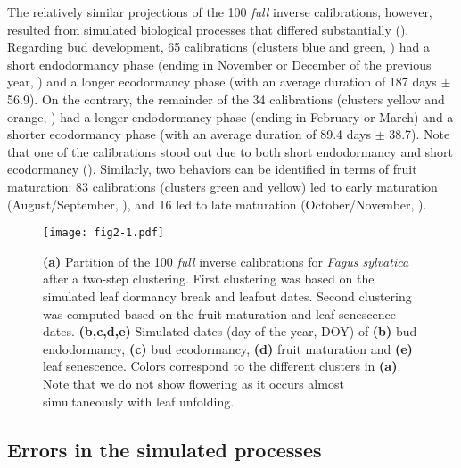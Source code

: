 \documentclass[preprint,12pt,authoryear]{elsarticle}
\begin{document}
The relatively similar projections of the 100 \emph{full} inverse calibrations, however, resulted from simulated biological processes that differed substantially (). Regarding bud development, 65 calibrations (clusters blue and green, )  had a short endodormancy phase (ending in November or December of the previous year, ) and a longer ecodormancy phase (with an average duration of 187 days $\pm$ 56.9). On the contrary, the remainder of the 34 calibrations (clusters yellow and orange, ) had a longer endodormancy phase (ending in February or March) and a shorter ecodormancy phase (with an average duration of 89.4 days $\pm$ 38.7). Note that one of the calibrations stood out due to both short endodormancy and short ecodormancy (). Similarly, two behaviors can be identified in terms of fruit maturation: 83 calibrations (clusters green and yellow) led to early maturation (August/September, ), and 16 led to late maturation (October/November, ).

\begin{figure}[hb]
\begin{subcaptiongroup}
\label{fig:2A} 
\label{fig:2B}
\label{fig:2C}
\label{fig:2D}
\label{fig:2E}
\end{subcaptiongroup}
\centerline{\texttt{[image: fig2-1.pdf]}}
\caption{\textbf{(a)} Partition of the 100 \emph{full} inverse calibrations for \emph{Fagus sylvatica} after a two-step clustering. First clustering was based on the simulated leaf dormancy break and leafout dates. Second clustering was computed based on the fruit maturation and leaf senescence dates. \textbf{(b,c,d,e)} Simulated dates (day of the year, DOY) of \textbf{(b)} bud endodormancy, \textbf{(c)} bud ecodormancy, \textbf{(d)} fruit maturation and \textbf{(e)} leaf senescence. Colors correspond to the different clusters in \textbf{(a)}. Note that we do not show flowering as it occurs almost simultaneously with leaf unfolding.}
\label{fig:2}
\end{figure}

\subsection{Errors in the simulated processes}
\end{document}

